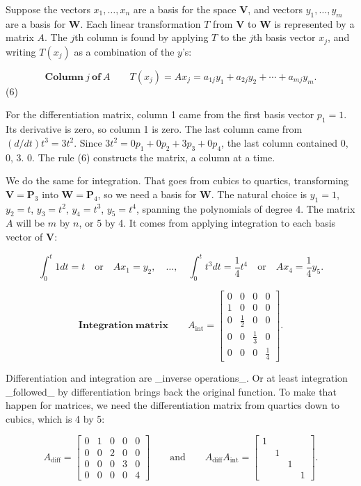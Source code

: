 Suppose the vectors \(x_{1},\ldots,x_{n}\) are a basis for the space \(\mathbf{V}\), and vectors \(y_{1},\ldots,y_{m}\) are a basis for \(\mathbf{W}\). Each linear transformation \(T\) from \(\mathbf{V}\) to \(\mathbf{W}\) is represented by a matrix \(A\). The \(j\)th column is found by applying \(T\) to the \(j\)th basis vector \(x_{j}\), and writing \(T(x_{j})\) as a combination of the \(y\)'s:

\[\mathbf{Column\ }j\ \mathbf{of\ }A\qquad T(x_{j})=Ax_{j}=a_{1j}y_{1}+a_{2j}y_{2}+ \cdots+a_{mj}y_{m}.\] (6)

For the differentiation matrix, column 1 came from the first basis vector \(p_{1}=1\). Its derivative is zero, so column 1 is zero. The last column came from \((d/dt)t^{3}=3t^{2}\). Since \(3t^{2}=0p_{1}+0p_{2}+3p_{3}+0p_{4}\), the last column contained 0, 0, 3. 0. The rule (6) constructs the matrix, a column at a time.

We do the same for integration. That goes from cubics to quartics, transforming \(\mathbf{V}=\mathbf{P}_{3}\) into \(\mathbf{W}=\mathbf{P}_{4}\), so we need a basis for \(\mathbf{W}\). The natural choice is \(y_{1}=1\), \(y_{2}=t\), \(y_{3}=t^{2}\), \(y_{4}=t^{3}\), \(y_{5}=t^{4}\), spanning the polynomials of degree 4. The matrix \(A\) will be \(m\) by \(n\), or 5 by 4. It comes from applying integration to each basis vector of \(\mathbf{V}\):

\[\int_{0}^{t}1dt=t\quad\text{or}\quad Ax_{1}=y_{2},\quad\ldots,\quad\int_{0}^{t }t^{3}dt=\frac{1}{4}t^{4}\quad\text{or}\quad Ax_{4}=\frac{1}{4}y_{5}.\]

\[\mathbf{Integration\ matrix}\qquad A_{\text{int}}=\begin{bmatrix}0&0&0&0\\ 1&0&0&0\\ 0&\frac{1}{2}&0&0\\ 0&0&\frac{1}{3}&0\\ 0&0&0&\frac{1}{4}\end{bmatrix}.\]

Differentiation and integration are _inverse operations_. Or at least integration _followed_ by differentiation brings back the original function. To make that happen for matrices, we need the differentiation matrix from quartics down to cubics, which is 4 by 5:

\[A_{\text{diff}}=\begin{bmatrix}0&1&0&0&0\\ 0&0&2&0&0\\ 0&0&0&3&0\\ 0&0&0&0&4\end{bmatrix}\qquad\text{and}\qquad A_{\text{diff}}A_{\text{int}}= \begin{bmatrix}1&&&\\ &1&&\\ &&1&\\ &&&1\end{bmatrix}.\]

